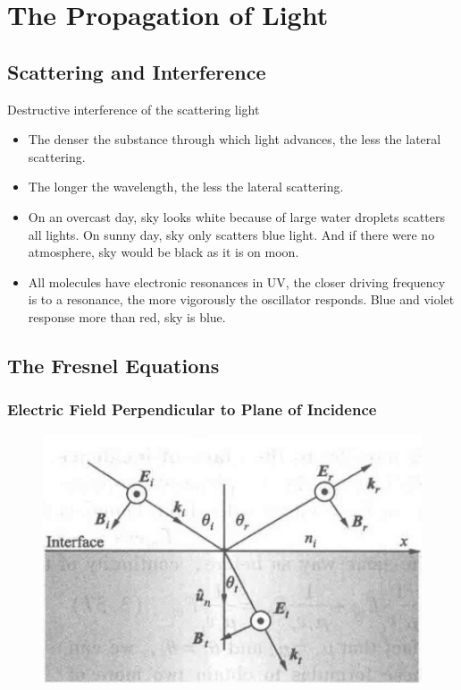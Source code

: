\chapter{The Propagation of Light}

\section{Scattering and Interference}

Destructive interference of the scattering light

\begin{itemize}
\item The denser the substance through which light advances, the less the lateral scattering.
\item The longer the wavelength, the less the lateral scattering.
\item On an overcast day, sky looks white because of large water droplets scatters all lights. On sunny day, sky only scatters blue light. And if there were no atmosphere, sky would be black as it is on moon.
\item All molecules have electronic resonances in UV, the closer driving frequency is to a resonance, the more vigorously the oscillator responds. Blue and violet response more than red, sky is blue.
\end{itemize}

\section{The Fresnel Equations}

\subsection{Electric Field Perpendicular to Plane of Incidence}

\begin{figure}[H]
  \centering
  \includegraphics[width=0.5\linewidth]{figures/Fresnel-perpendicular}
  \label{fig:}
\end{figure}

